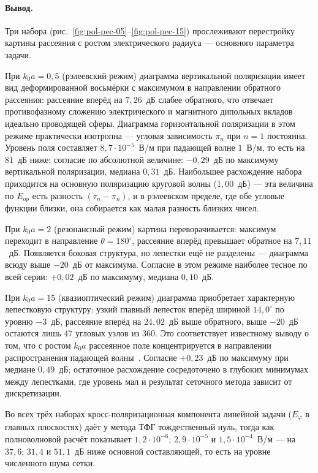 \documentclass[11pt,a4paper]{article}
\begin{document}
\paragraph{Вывод.}
Три набора (рис.~\ref{fig:pol-pec-05}--\ref{fig:pol-pec-15}) прослеживают
перестройку картины рассеяния с ростом электрического радиуса --- основного
параметра задачи.

При $k_0a = 0{,}5$ (рэлеевский режим) диаграмма вертикальной поляризации имеет вид
деформированной восьмёрки с максимумом в направлении обратного рассеяния:
рассеяние вперёд на $7{,}26$~дБ слабее обратного, что отвечает противофазному
сложению электрического и магнитного дипольных вкладов идеально проводящей сферы.
Диаграмма горизонтальной поляризации в этом режиме практически изотропна ---
угловая зависимость $\pi_n$ при $n = 1$ постоянна. Уровень поля составляет
$8{,}7\cdot10^{-5}$~В/м при падающей волне $1$~В/м, то есть на $81$~дБ ниже;
согласие по абсолютной величине: $-0{,}29$~дБ по максимуму вертикальной
поляризации, медиана $0{,}31$~дБ. Наибольшее расхождение набора приходится на
основную поляризацию круговой волны ($1{,}00$~дБ) --- эта величина по
$E_{op}$ есть разность $(\tau_n - \pi_n)$, и в рэлеевском пределе, где обе
угловые функции близки, она собирается как малая разность близких чисел.

При $k_0a = 2$ (резонансный режим) картина переворачивается: максимум переходит в
направление $\theta = 180^\circ$, рассеяние вперёд превышает обратное на
$7{,}11$~дБ. Появляется боковая структура, но лепестки ещё не разделены ---
диаграмма всюду выше $-20$~дБ от максимума. Согласие в этом режиме наиболее тесное по
всей серии: $+0{,}02$~дБ по максимуму, медиана $0{,}10$~дБ.

При $k_0a = 15$ (квазиоптический режим) диаграмма приобретает характерную
лепестковую структуру: узкий главный лепесток вперёд шириной $14{,}0^\circ$ по
уровню $-3$~дБ, рассеяние вперёд на $24{,}02$~дБ выше обратного, выше $-20$~дБ
остаются лишь 47 угловых узлов из 360. Это соответствует известному выводу о том,
что с ростом $k_0a$ рассеянное поле концентрируется в направлении распространения
падающей волны~\cite{denisov2016tensors}. Согласие $+0{,}23$~дБ по максимуму при
медиане $0{,}49$~дБ; остаточное расхождение сосредоточено в глубоких минимумах
между лепестками, где уровень мал и результат сеточного метода зависит от
дискретизации.

Во всех трёх наборах кросс-поляризационная компонента линейной задачи
($E_\varphi$ в главных плоскостях) даёт у метода ТФГ тождественный нуль, тогда как полноволновой расчёт
показывает $1{,}2\cdot10^{-6}$; $2{,}9\cdot10^{-5}$ и $1{,}5\cdot10^{-4}$~В/м ---
на $37{,}6$; $31{,}4$ и $51{,}1$~дБ ниже основной составляющей, то есть на уровне
численного шума сетки.
\end{document}
